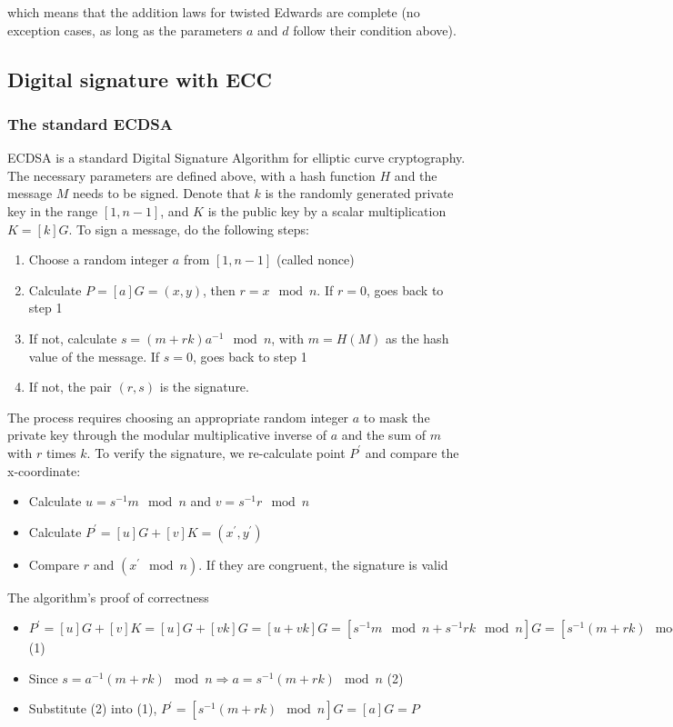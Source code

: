 which means that the addition laws for twisted Edwards are complete (no exception cases, as long as the parameters $a$ and $d$ follow their condition above).

\subsection{Digital signature with ECC}

\subsubsection{The standard ECDSA}
ECDSA is a standard Digital Signature Algorithm for elliptic curve cryptography. The necessary parameters are defined above, with a hash function $H$ and the message $M$ needs to be signed. Denote that $k$ is the randomly generated private key in the range  $[1, n - 1]$, and $K$ is the public key by a scalar multiplication $K =[k]G$. To sign a message, do the following steps:

\begin{enumerate}
  \item Choose a random integer $a$ from $[1, n - 1]$ (called nonce)
  \item Calculate $P = [a]G = (x, y)$, then $r = x \mod n$. If $r = 0$, goes back to step 1
  \item If not, calculate $s=(m+rk) a^{-1} \mod n$, with $m = H(M)$ as the hash value of the message. If $s = 0$, goes back to step 1
  \item If not, the pair $(r, s)$ is the signature.
\end{enumerate}

The process requires choosing an appropriate random integer $a$ to mask the private key through the modular multiplicative inverse of $a$ and the sum of $m$ with $r$ times $k$. To verify the signature, we re-calculate point $P^\prime$ and compare the x-coordinate:

\begin{itemize}
  \item Calculate $u = s^{-1} m \mod n$ and $v = s^{-1} r \mod n$
  \item Calculate $P^\prime = [u]G + [v]K = (x^\prime, y^\prime)$
  \item Compare $r$ and $(x^\prime \mod n)$. If they are congruent, the signature is valid
\end{itemize}

The algorithm’s proof of correctness

\begin{itemize}
  \item $P^\prime = [u]G + [v]K = [u]G + [vk]G = [u +vk]G = [s^{-1}m \mod n + s^{-1}rk \mod n]G = [s^{-1}(m + rk) \mod n]G$ (1)
  \item Since $s = a^{-1}(m+rk) \mod n \Rightarrow a = s^{-1}(m+rk) \mod n$ (2)
  \item Substitute (2) into (1), $P^\prime = [s^{-1}(m + rk) \mod n]G = [a]G = P$
\end{itemize}

